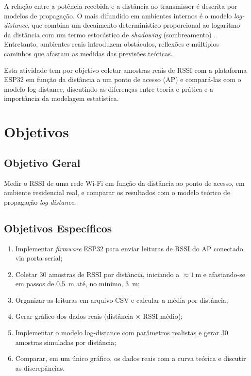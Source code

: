 \documentclass[
  12pt,
  a4paper,
  oneside,
  brazil,
  chapter=TITLE,
  section=TITLE,
]{abntex2}
\begin{document}
A rela\c{c}\~ao entre a pot\^encia recebida e a dist\^ancia ao transmissor \'e
descrita por modelos de propaga\c{c}\~ao. O mais difundido em ambientes internos
\'e o modelo \textit{log-distance}, que combina um decaimento determin\'istico
proporcional ao logaritmo da dist\^ancia com um termo estoc\'astico de
\textit{shadowing} (sombreamento) \cite{rappaport2002,goldsmith2005}. Entretanto,
ambientes reais introduzem obst\'aculos, reflex\~oes e m\'ultiplos caminhos que
afastam as medidas das previs\~oes te\'oricas.

Esta atividade tem por objetivo coletar amostras reais de RSSI com a plataforma
ESP32 em fun\c{c}\~ao da dist\^ancia a um ponto de acesso (AP) e compar\'a-las
com o modelo log-distance, discutindo as diferen\c{c}as entre teoria e pr\'atica
e a import\^ancia da modelagem estat\'istica.

\chapter{Objetivos}

\section{Objetivo Geral}

Medir o RSSI de uma rede Wi-Fi em fun\c{c}\~ao da dist\^ancia ao ponto de acesso,
em ambiente residencial real, e comparar os resultados com o modelo te\'orico de
propaga\c{c}\~ao \textit{log-distance}.

\section{Objetivos Espec\'ificos}

\begin{enumerate}[label=\alph*)]
  \item Implementar \textit{firmware} ESP32 para enviar leituras de RSSI do AP
        conectado via porta serial;
  \item Coletar 30 amostras de RSSI por dist\^ancia, iniciando a
        $\approx \SI{1}{\meter}$ e afastando-se em passos de \SI{0.5}{\meter}
        at\'e, no m\'inimo, \SI{3}{\meter};
  \item Organizar as leituras em arquivo CSV e calcular a m\'edia por
        dist\^ancia;
  \item Gerar gr\'afico dos dados reais (dist\^ancia $\times$ RSSI m\'edio);
  \item Implementar o modelo log-distance com par\^ametros realistas e gerar
        30 amostras simuladas por dist\^ancia;
  \item Comparar, em um \'unico gr\'afico, os dados reais com a curva te\'orica e
        discutir as discrep\^ancias.
\end{enumerate}
\end{document}
